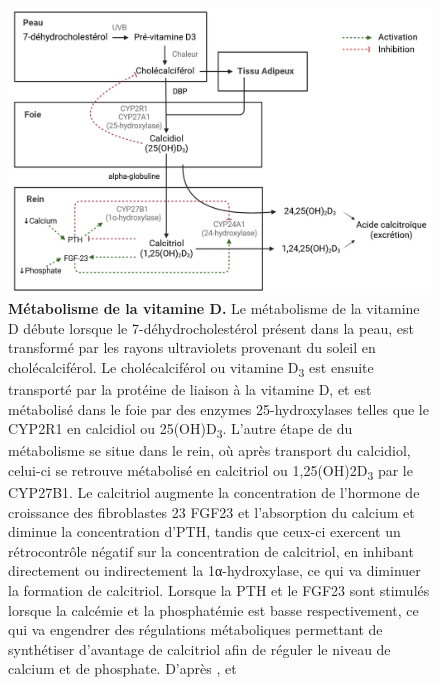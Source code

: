 \documentclass[
  a4paper,
  DIV=11,
  numbers=noendperiod,
  listof=totoc]{scrreprt}
\begin{document}
\begin{figure}

{\centering \includegraphics{figures/vitd-metabolism-fr.png}

}

\caption[\textbf{Métabolisme de la vitamine
D.}]{\label{fig-vitd-metabolism}\textbf{Métabolisme de la vitamine D.}
Le métabolisme de la vitamine D débute lorsque le 7-déhydrocholestérol
présent dans la peau, est transformé par les rayons ultraviolets
provenant du soleil en cholécalciférol. Le cholécalciférol ou vitamine
D\textsubscript{3} est ensuite transporté par la protéine de liaison à
la vitamine D, et est métabolisé dans le foie par des enzymes
25-hydroxylases telles que le CYP2R1 en calcidiol ou
25(OH)D\textsubscript{3}. L'autre étape de du métabolisme se situe dans
le rein, où après transport du calcidiol, celui-ci se retrouve
métabolisé en calcitriol ou 1,25(OH)2D\textsubscript{3} par le CYP27B1.
Le calcitriol augmente la concentration de l'hormone de croissance des
fibroblastes 23 \acs{FGF23} et l'absorption du calcium et diminue la
concentration d'\acf{PTH}, tandis que ceux-ci exercent un rétrocontrôle
négatif sur la concentration de calcitriol, en inhibant directement ou
indirectement la 1α-hydroxylase, ce qui va diminuer la formation de
calcitriol. Lorsque la PTH et le FGF23 sont stimulés lorsque la calcémie
et la phosphatémie est basse respectivement, ce qui va engendrer des
régulations métaboliques permettant de synthétiser d'avantage de
calcitriol afin de réguler le niveau de calcium et de phosphate. D'après
\textcite{Christakos.2010}, \textcite{Tsiaras.2011} et
\textcite{Dankers.2017}}

\end{figure}
\end{document}
